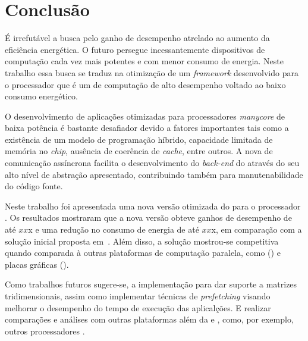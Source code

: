 %

\chapter{Conclusão}
\label{cap:conclusao}

É irrefutável a busca pelo ganho de desempenho atrelado ao aumento da eficiência energética. O futuro persegue incessantemente dispositivos de computação cada vez mais potentes e com menor consumo de energia. Neste trabalho essa busca se traduz na otimização de um \textit{framework} desenvolvido para o processador \mppa que é um \chip de computação de alto desempenho voltado ao baixo consumo energético. 

O desenvolvimento de aplicações otimizadas para processadores \textit{manycore} de baixa potência é bastante desafiador devido a fatores importantes tais como a existência de um modelo de programação híbrido, capacidade limitada de memória no \textit{chip}, ausência de coerência de \textit{cache}, entre outros. A nova \api de comunicação assíncrona facilita o desenvolvimento do \textit{back-end} do \fw através do seu alto nível de abstração apresentado, contribuindo também para manutenabilidade do código fonte.

Neste trabalho foi apresentada uma nova versão otimizada do \fw \pskel para o processador \mppa. Os resultados mostraram que a nova versão obteve ganhos de desempenho de até $xx$x e uma redução no consumo de energia de até $xx$x, em comparação com a solução inicial proposta em~\cite{Podesta:TCC}. Além disso, a solução mostrou-se competitiva quando comparada à outras plataformas de computação paralela, como \multicore (\cpu) e placas gráficas (\gpu). 

Como trabalhos futuros sugere-se, a implementação para dar suporte a matrizes tridimensionais, assim como implementar técnicas de \textit{prefetching} visando melhorar o desempenho do tempo de execução das aplicalções. E realizar comparações e análises com outras plataformas além da \cpu e \gpu, como, por exemplo, outros processadores \manycore.